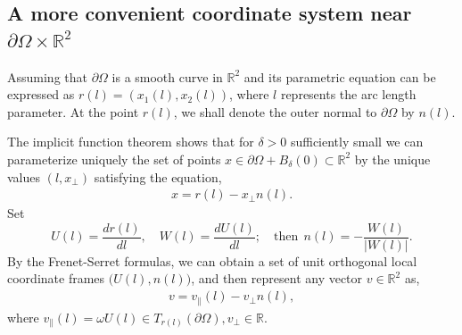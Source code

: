 \documentclass[11pt,reqno]{amsart}%
\theoremstyle{definition}
\theoremstyle{remark}
\begin{document}

\subsection{ A more convenient coordinate system near $\partial\Omega\times \mathbb{R}^{2}$}
 Assuming that $\partial\Omega$ is a smooth curve in $\mathbb{R}^{2}$ and its parametric equation can be expressed as $r(l)=(x_{1}(l),x_{2}(l))$, where $l$ represents the arc length parameter.
 At the point $r(l)$, we shall denote the outer normal to $\partial\Omega$  by $n(l)$.

The implicit function theorem shows that for $\delta > 0$ sufficiently small we can
parameterize uniquely the set of points  $x\in \partial\Omega + B_{\delta}(0) \subset \mathbb{R}^{2}  $ by the unique
values $(l, x_{\bot})$ satisfying the equation,
\begin{align}
x = r(l)-x_{\bot}n (l).  \label{v2.1}
\end{align}
Set
$$U(l)=\frac{dr(l)}{dl},\quad W(l)=\frac{dU(l)}{dl}; \quad \text{then}\,\;  n(l)=-\frac{W(l)}{|W(l)|}.$$
By the Frenet-Serret formulas, we can obtain a set of unit orthogonal local coordinate frames  $\big(U(l),n(l)\big)$, and then represent any vector $v\in  \mathbb{R}^{2}$ as,
\begin{align}
v = v_{\|}(l)-v_{\bot}n (l), \label{v2.2}
\end{align}
where $v_{\|}(l)=\omega U(l)\in T_{r(l)}(\partial\Omega), v_{\bot}\in \mathbb{R}.$
\end{document}
